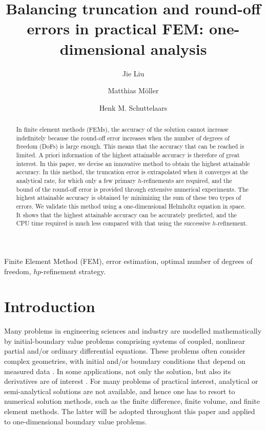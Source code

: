 \documentclass[review,3p]{elsarticle}
\begin{document}
\begin{frontmatter}

\title{Balancing truncation and round-off errors in practical FEM: one-dimensional analysis}

 \author[1]{Jie Liu}
 \author[1]{Matthias M\"oller}
 \author[1]{Henk M. Schuttelaars}
 
 \address[1]{Delft Institute of Applied Mathematics\\ Delft University of Technology\\ Van Mourik Broekmanweg 6, 2628 XE Delft, The Netherlands}

\begin{abstract}
In finite element methods (FEMs), the accuracy of the solution cannot increase indefinitely because the round-off error increases when the number of degrees of freedom (DoFs) is large enough. This means that the accuracy that can be reached is limited. A priori information of the highest attainable accuracy is therefore of great interest.   
In this paper, we devise an innovative method to obtain the highest attainable accuracy.
In this method, the truncation error is extrapolated when it converges at the analytical rate, for which only a few primary $h$-refinements are required, and the bound of the round-off error is provided through extensive numerical experiments. The highest attainable accuracy is obtained by minimizing the sum of these two types of errors.
We validate this method using a one-dimensional Helmholtz equation in space. 
It shows that the highest attainable accuracy can be accurately predicted, and the CPU time required is much less compared with that using the successive $h$-refinement. 
\end{abstract}

\begin{keyword}
Finite Element Method (FEM), error estimation, optimal number of degrees of freedom, $hp$-refinement strategy.
\end{keyword}

\end{frontmatter}

\section{Introduction}

Many problems in engineering sciences and industry are modelled mathematically by initial-boundary value problems comprising systems of coupled, nonlinear partial and/or ordinary differential equations. These problems often consider complex geometries, with initial and/or boundary conditions that depend on measured data \cite{Kumar2016}. 
In some applications, not only the solution, but also its derivatives are of interest \cite{Kumar2016,carey1982derivative}.
For many problems of practical interest, analytical or semi-analytical solutions are not available, and hence one has to resort to numerical solution methods, such as the finite difference, finite volume, and finite element methods. The latter will be adopted throughout this paper and applied to one-dimensional boundary value problems.
\end{document}
